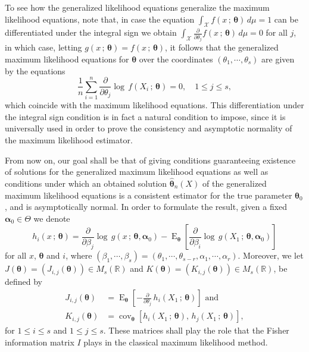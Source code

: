 \documentclass[12pt]{article} %
\newcommand{\bs}{\boldsymbol}
\newcommand{\on}{\operatorname}
\theoremstyle{definition}
\begin{document}
To see how the generalized likelihood equations generalize the maximum likelihood equations, note that, in case the equation $\int_{\mathcal{X}} f(x\,;\,\bs{\theta})\, d\mu =1$ can be differentiated under the integral sign we obtain $\int_{\mathcal{X}} \frac{\partial}{\partial \theta_j} f(x\,;\,\bs{\theta})\, d\mu =0$ for all $j$, in which case, letting $g(x\,;\,\bs{\theta})=f(x\,;\,\bs{\theta})$, it follows that the generalized maximum likelihood equations for $\bs{\theta}$ over the coordinates $(\theta_1,\cdots,\theta_s)$ are given by the equations
\begin{equation*}
\frac{1}{n}\sum_{i=1}^n \frac{\partial}{\partial \theta_j}  \log\, f(X_i\,;\,\bs{\theta}) = 0,\quad 1\leq j\leq s,
\end{equation*}
which coincide with the maximum likelihood equations. This differentiation under the integral sign condition is in fact a natural condition to impose, since it is universally used in order to prove the consistency and asymptotic normality of the maximum likelihood estimator.

From now on, our goal shall be that of giving conditions guaranteeing existence of solutions for the generalized maximum likelihood equations as well as conditions under which an obtained solution $\bs{\hat{\theta}}_n(X)$ of the generalized maximum likelihood equations is a consistent estimator for the true parameter $\bs{\theta}_0$, and is asymptotically normal. In order to formulate the result, given a fixed $\bs{\alpha}_0\in \Theta$ we denote
\begin{equation}\label{defh}
h_i(x\,;\,\bs{\theta}) = \frac{\partial}{\partial \beta_j}\log\, g \left(x\,;\,\bs{\theta},\bs{\alpha}_0\right) - \on{E}_{\bs{\theta}}\left[\frac{\partial}{\partial \beta_i}\log\, g \left(X_1\,;\,\bs{\theta},\bs{\alpha}_0\right)\right]
\end{equation}
for all $x$, $\bs{\theta}$ and $i$, where $(\beta_1,\cdots,\beta_s)=(\theta_1,\cdots,\theta_{s-r},\alpha_1,\cdots,\alpha_r)$. Moreover, we let $J(\bs{\theta})=\left(J_{i,j}(\bs{\theta})\right)\in M_{s}(\mathbb{R})$ and $K(\bs{\theta})=\left(K_{i,j}(\bs{\theta})\right)\in M_{s}(\mathbb{R})$, be defined by
 \begin{equation}\label{eqj}
 \begin{aligned}J_{i,j}(\bs{\theta})&=
 \on{E}_{\bs{\theta}} \left[-\frac{\partial}{\partial\theta_j}\, h_i(X_1\, ;\, \bs{\theta})\right]\mbox{ and}\\
 K_{i,j}(\bs{\theta}) &=  \on{cov}_{\bs{\theta}} \left[h_i(X_1\, ;\, \bs{\theta}),\,  h_j(X_1\, ;\, \bs{\theta})\right],
 \end{aligned}
 \end{equation}
 for $1\leq i\leq s$ and $1\leq j\leq s$. These matrices shall play the role that the Fisher information matrix $I$ plays in the classical maximum likelihood method.
\end{document}
